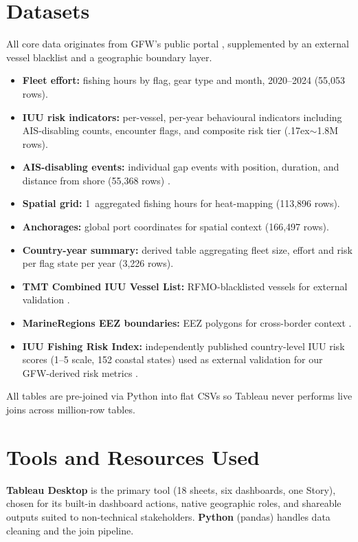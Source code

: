 \documentclass[sigconf]{acmart}
\begin{document}
\section{Datasets}
All core data originates from GFW's public portal \cite{GFW}, supplemented by an external vessel blacklist and a geographic boundary layer.
\begin{itemize}
    \item \textbf{Fleet effort:} fishing hours by flag, gear type and month, 2020--2024 (55,053 rows).
    \item \textbf{IUU risk indicators:} per-vessel, per-year behavioural indicators including AIS-disabling counts, encounter flags, and composite risk tier ({\raise.17ex\hbox{$\scriptstyle\sim$}}1.8M rows).
    \item \textbf{AIS-disabling events:} individual gap events with position, duration, and distance from shore (55,368 rows) \cite{Welch2022}.
    \item \textbf{Spatial grid:} 1\textdegree\ aggregated fishing hours for heat-mapping (113,896 rows).
    \item \textbf{Anchorages:} global port coordinates for spatial context (166,497 rows).
    \item \textbf{Country-year summary:} derived table aggregating fleet size, effort and risk per flag state per year (3,226 rows).
    \item \textbf{TMT Combined IUU Vessel List:} RFMO-blacklisted vessels for external validation \cite{TMT}.
    \item \textbf{MarineRegions EEZ boundaries:} EEZ polygons for cross-border context \cite{FlandersMarine}.
    \item \textbf{IUU Fishing Risk Index:} independently published country-level IUU risk scores (1--5 scale, 152 coastal states) used as external validation for our GFW-derived risk metrics \cite{IUUIndex}.
\end{itemize}
All tables are pre-joined via Python into flat CSVs so Tableau never performs live joins across million-row tables.

\section{Tools and Resources Used}
\textbf{Tableau Desktop} is the primary tool (18 sheets, six dashboards, one Story), chosen for its built-in dashboard actions, native geographic roles, and shareable outputs suited to non-technical stakeholders. \textbf{Python} (pandas) handles data cleaning and the join pipeline.
\end{document}
